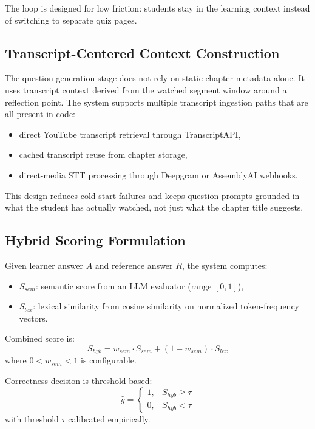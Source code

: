 \documentclass[conference]{IEEEtran}
\begin{document}
The loop is designed for low friction: students stay in the learning context instead of switching to separate quiz pages.

\subsection{Transcript-Centered Context Construction}
The question generation stage does not rely on static chapter metadata alone. It uses transcript context derived from the watched segment window around a reflection point. The system supports multiple transcript ingestion paths that are all present in code:
\begin{itemize}
\item direct YouTube transcript retrieval through TranscriptAPI,
\item cached transcript reuse from chapter storage,
\item direct-media STT processing through Deepgram or AssemblyAI webhooks.
\end{itemize}

This design reduces cold-start failures and keeps question prompts grounded in what the student has actually watched, not just what the chapter title suggests.

\subsection{Hybrid Scoring Formulation}
Given learner answer $A$ and reference answer $R$, the system computes:
\begin{itemize}
\item $S_{sem}$: semantic score from an LLM evaluator (range $[0,1]$),
\item $S_{lex}$: lexical similarity from cosine similarity on normalized token-frequency vectors.
\end{itemize}

Combined score is:
\begin{equation}
S_{hyb} = w_{sem} \cdot S_{sem} + (1 - w_{sem}) \cdot S_{lex}
\end{equation}
where $0 < w_{sem} < 1$ is configurable.

Correctness decision is threshold-based:
\begin{equation}
\hat{y} =
\begin{cases}
1, & S_{hyb} \ge \tau \\
0, & S_{hyb} < \tau
\end{cases}
\end{equation}
with threshold $\tau$ calibrated empirically.
\end{document}
